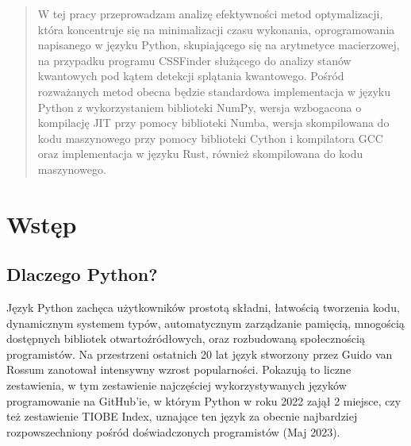 \documentclass[12pt, a4paper]{article}
\begin{document}
  \begin{sloppypar}
    \begin{abstract}
      W tej pracy przeprowadzam analizę efektywności metod optymalizacji, która
      koncentruje się na minimalizacji czasu wykonania, oprogramowania napisanego w języku
      Python\cite{Python_Language}\cite{ML_Learning_Python}, skupiającego się na
      arytmetyce macierzowej, na przypadku programu CSSFinder służącego do analizy stanów
      kwantowych pod kątem detekcji splątania kwantowego. Pośród rozważanych metod
      obecna będzie standardowa implementacja w języku Python z wykorzystaniem
      biblioteki NumPy\cite{NumPy_Article}\cite{NumPy_Doc}, wersja wzbogacona o kompilację
      JIT przy pomocy biblioteki Numba\cite{Numba_Article}\cite{Numba_Doc}, wersja
      skompilowana do kodu maszynowego przy pomocy biblioteki Cython\cite{Cython_The_Best_Of_Both}\cite{Cython_Org}
      i kompilatora GCC\cite{GCC_Org} oraz implementacja w języku Rust\cite{Rust_Programming_Language},
      również skompilowana do kodu maszynowego.
    \end{abstract}

    \section{Wstęp}


    \subsection{Dlaczego Python?}


    Język Python zachęca użytkowników prostotą składni, łatwością tworzenia kodu,
    dynamicznym systemem typów, automatycznym zarządzanie pamięcią, mnogością dostępnych
    bibliotek otwartoźródłowych, oraz rozbudowaną społecznością programistów. Na
    przestrzeni ostatnich 20 lat język stworzony przez Guido van Rossum zanotował
    intensywny wzrost popularności. Pokazują to liczne zestawienia, w tym zestawienie
    najczęściej wykorzystywanych języków programowanie na GitHub'ie\cite{GitHub_Top_languages},
    w którym Python w roku 2022 zajął 2 miejsce, czy też zestawienie TIOBE Index\cite{TIOBE_Software_Index},
    uznające ten język za obecnie najbardziej rozpowszechniony pośród doświadczonych programistów
    (Maj 2023).


\end{sloppypar}
\end{document}
